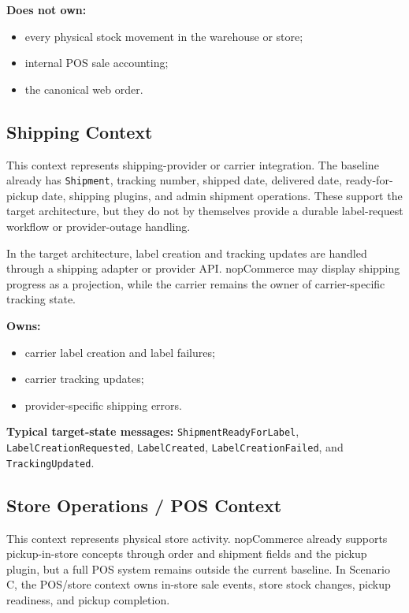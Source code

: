 \textbf{Does not own:}
\begin{itemize}
    \item every physical stock movement in the warehouse or store;
    \item internal POS sale accounting;
    \item the canonical web order.
\end{itemize}

\subsection{Shipping Context}

This context represents shipping-provider or carrier integration. The baseline already has
\texttt{Shipment}, tracking number, shipped date, delivered date, ready-for-pickup date,
shipping plugins, and admin shipment operations. These support the target architecture, but
they do not by themselves provide a durable label-request workflow or provider-outage handling.

In the target architecture, label creation and tracking updates are handled through a shipping
adapter or provider API. nopCommerce may display shipping progress as a projection, while the
carrier remains the owner of carrier-specific tracking state.

\textbf{Owns:}
\begin{itemize}
    \item carrier label creation and label failures;
    \item carrier tracking updates;
    \item provider-specific shipping errors.
\end{itemize}

\textbf{Typical target-state messages:} \texttt{ShipmentReadyForLabel},
\texttt{LabelCreationRequested}, \texttt{LabelCreated}, \texttt{LabelCreationFailed}, and
\texttt{TrackingUpdated}.

\subsection{Store Operations / POS Context}

This context represents physical store activity. nopCommerce already supports pickup-in-store
concepts through order and shipment fields and the pickup plugin, but a full POS system remains
outside the current baseline. In Scenario C, the POS/store context owns in-store sale events,
store stock changes, pickup readiness, and pickup completion.

